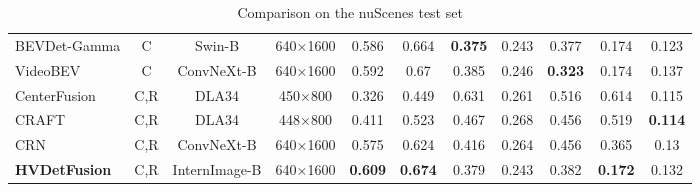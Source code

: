 \documentclass[10pt,twocolumn,letterpaper]{article}
\begin{document}
\begin{table*}[h]
\begin{tabular}{@{}lcccccccccc@{}}
{BEVDet-Gamma}       & C   & Swin-B         & 640×1600 & 0.586          & 0.664  & \textbf{0.375} & 0.243 & 0.377          & 0.174  & 0.123 \\
{VideoBEV}           & C   & ConvNeXt-B     & 640×1600 & 0.592          & 0.67           & 0.385  & 0.246 & \textbf{0.323} & 0.174  & 0.137 \\\hline
{CenterFusion}       & C,R & DLA34          & 450×800  & 0.326          & 0.449          & 0.631  & 0.261 & 0.516          & 0.614  & 0.115 \\
{CRAFT}              & C,R & DLA34          & 448×800  & 0.411          & 0.523          & 0.467  & 0.268 & 0.456          & 0.519  & \textbf{0.114} \\
CRN                  & C,R & ConvNeXt-B     & 640×1600 & 0.575          & 0.624          & 0.416  & 0.264 & 0.456          & 0.365  & 0.13  \\
\textbf{HVDetFusion} & C,R & InternImage-B  & 640×1600 & \textbf{0.609} & \textbf{0.674} & 0.379  & 0.243 & 0.382  & \textbf{0.172} & 0.132 \\
\hline
\end{tabular}
\caption{Comparison on the nuScenes test set}
\label{tab:score_on_test_set}
\end{table*}
\end{document}
